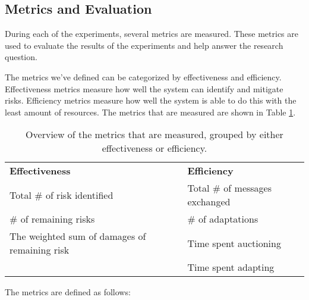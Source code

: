\subsection{Metrics and Evaluation}
\label{ssec:metrics}
During each of the experiments, several metrics are measured. These metrics are used to evaluate the results of the experiments and help answer the research question. 

The metrics we've defined can be categorized by effectiveness and efficiency. Effectiveness metrics measure how well the system can identify and mitigate risks. Efficiency metrics measure how well the system is able to do this with the least amount of resources. The metrics that are measured are shown in Table \ref{table:metrics-groups}.

\begin{table}[H]
    \centering
    \begin{tabular}{l|l}
        \textbf{Effectiveness}            & \textbf{Efficiency}            \\
        Total \# of risk identified       & Total \# of messages exchanged \\
        \# of remaining risks             & \# of adaptations              \\
        The weighted sum of damages of remaining risk & Time spent auctioning  \\
                                          & Time spent adapting            \\
    \end{tabular}
    \caption{\label{table:metrics-groups}Overview of the metrics that are measured, grouped by either effectiveness or efficiency.}
\end{table}


The metrics are defined as follows:

